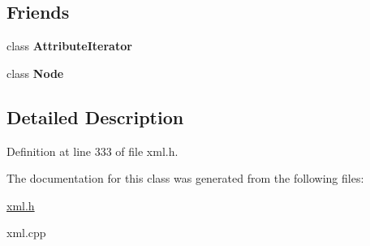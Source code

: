 \subsection*{Friends}
\begin{DoxyCompactItemize}
\item 
\hypertarget{classphys_1_1xml_1_1Attribute_a1ed8790083a80b2604beba1c666bce6e}{
class {\bfseries AttributeIterator}}
\label{da/ddf/classphys_1_1xml_1_1Attribute_a1ed8790083a80b2604beba1c666bce6e}

\item 
\hypertarget{classphys_1_1xml_1_1Attribute_a6db9d28bd448a131448276ee03de1e6d}{
class {\bfseries Node}}
\label{da/ddf/classphys_1_1xml_1_1Attribute_a6db9d28bd448a131448276ee03de1e6d}

\end{DoxyCompactItemize}


\subsection{Detailed Description}


Definition at line 333 of file xml.h.



The documentation for this class was generated from the following files:\begin{DoxyCompactItemize}
\item 
\hyperlink{xml_8h}{xml.h}\item 
xml.cpp\end{DoxyCompactItemize}
